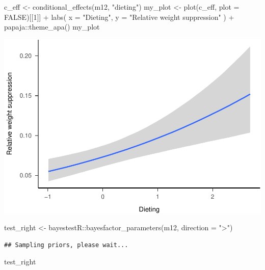 \documentclass[
]{article}
\newenvironment{Shaded}{\begin{snugshade}}{\end{snugshade}}
\newcommand{\AttributeTok}[1]{\textcolor[rgb]{0.77,0.63,0.00}{#1}}
\newcommand{\ConstantTok}[1]{\textcolor[rgb]{0.00,0.00,0.00}{#1}}
\newcommand{\DecValTok}[1]{\textcolor[rgb]{0.00,0.00,0.81}{#1}}
\newcommand{\FunctionTok}[1]{\textcolor[rgb]{0.00,0.00,0.00}{#1}}
\newcommand{\NormalTok}[1]{#1}
\newcommand{\OtherTok}[1]{\textcolor[rgb]{0.56,0.35,0.01}{#1}}
\newcommand{\SpecialCharTok}[1]{\textcolor[rgb]{0.00,0.00,0.00}{#1}}
\newcommand{\StringTok}[1]{\textcolor[rgb]{0.31,0.60,0.02}{#1}}
\begin{document}
\begin{Shaded}
\begin{Highlighting}[]
\NormalTok{c\_eff }\OtherTok{\textless{}{-}} \FunctionTok{conditional\_effects}\NormalTok{(m12, }\StringTok{"dieting"}\NormalTok{)}
\NormalTok{my\_plot }\OtherTok{\textless{}{-}} \FunctionTok{plot}\NormalTok{(c\_eff, }\AttributeTok{plot =} \ConstantTok{FALSE}\NormalTok{)[[}\DecValTok{1}\NormalTok{]] }\SpecialCharTok{+}
  \FunctionTok{labs}\NormalTok{(}
    \AttributeTok{x =} \StringTok{"Dieting"}\NormalTok{,}
    \AttributeTok{y =} \StringTok{"Relative weight suppression"}
\NormalTok{  ) }\SpecialCharTok{+}
\NormalTok{  papaja}\SpecialCharTok{::}\FunctionTok{theme\_apa}\NormalTok{()}
\NormalTok{my\_plot}
\end{Highlighting}
\end{Shaded}

\includegraphics{046_weight_history_alpha_files/figure-latex/unnamed-chunk-12-1.pdf}

\begin{Shaded}
\begin{Highlighting}[]
\NormalTok{test\_right }\OtherTok{\textless{}{-}}\NormalTok{ bayestestR}\SpecialCharTok{::}\FunctionTok{bayesfactor\_parameters}\NormalTok{(m12, }\AttributeTok{direction =} \StringTok{"\textgreater{}"}\NormalTok{)}
\end{Highlighting}
\end{Shaded}

\begin{verbatim}
## Sampling priors, please wait...
\end{verbatim}

\begin{Shaded}
\begin{Highlighting}[]
\NormalTok{test\_right}
\end{Highlighting}
\end{Shaded}
\end{document}
